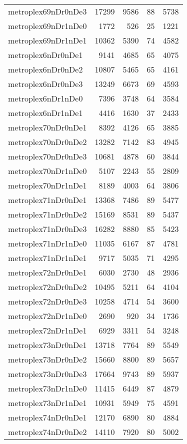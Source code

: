 \begin{longtable}{lrrrr}
metroplex69nDr0nDe3 & 17299 & 9586 & 88 & 5738 \\
metroplex69nDr1nDe0 & 1772 & 526 & 25 & 1221 \\
metroplex69nDr1nDe1 & 10362 & 5390 & 74 & 4582 \\
metroplex6nDr0nDe1 & 9141 & 4685 & 65 & 4075 \\
metroplex6nDr0nDe2 & 10807 & 5465 & 65 & 4161 \\
metroplex6nDr0nDe3 & 13249 & 6673 & 69 & 4593 \\
metroplex6nDr1nDe0 & 7396 & 3748 & 64 & 3584 \\
metroplex6nDr1nDe1 & 4416 & 1630 & 37 & 2433 \\
metroplex70nDr0nDe1 & 8392 & 4126 & 65 & 3885 \\
metroplex70nDr0nDe2 & 13282 & 7142 & 83 & 4945 \\
metroplex70nDr0nDe3 & 10681 & 4878 & 60 & 3844 \\
metroplex70nDr1nDe0 & 5107 & 2243 & 55 & 2809 \\
metroplex70nDr1nDe1 & 8189 & 4003 & 64 & 3806 \\
metroplex71nDr0nDe1 & 13368 & 7486 & 89 & 5477 \\
metroplex71nDr0nDe2 & 15169 & 8531 & 89 & 5437 \\
metroplex71nDr0nDe3 & 16282 & 8880 & 85 & 5423 \\
metroplex71nDr1nDe0 & 11035 & 6167 & 87 & 4781 \\
metroplex71nDr1nDe1 & 9717 & 5035 & 71 & 4295 \\
metroplex72nDr0nDe1 & 6030 & 2730 & 48 & 2936 \\
metroplex72nDr0nDe2 & 10495 & 5211 & 64 & 4104 \\
metroplex72nDr0nDe3 & 10258 & 4714 & 54 & 3600 \\
metroplex72nDr1nDe0 & 2690 & 920 & 34 & 1736 \\
metroplex72nDr1nDe1 & 6929 & 3311 & 54 & 3248 \\
metroplex73nDr0nDe1 & 13718 & 7764 & 89 & 5549 \\
metroplex73nDr0nDe2 & 15660 & 8800 & 89 & 5657 \\
metroplex73nDr0nDe3 & 17664 & 9743 & 89 & 5937 \\
metroplex73nDr1nDe0 & 11415 & 6449 & 87 & 4879 \\
metroplex73nDr1nDe1 & 10931 & 5949 & 75 & 4591 \\
metroplex74nDr0nDe1 & 12170 & 6890 & 80 & 4884 \\
metroplex74nDr0nDe2 & 14110 & 7920 & 80 & 5002 \\

\end{longtable}
